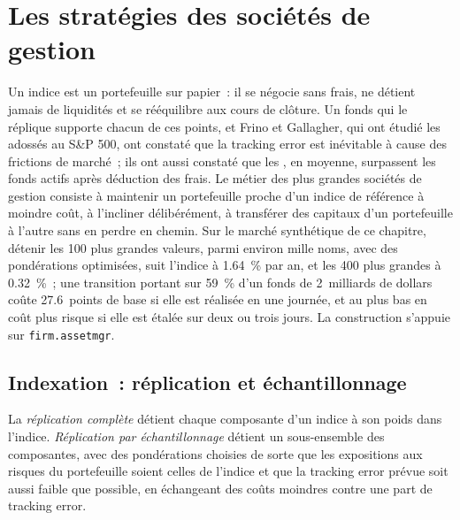 \chapter{Les stratégies des sociétés de gestion}\label{ch:s1:the-asset-managers-strategies}

Un indice est un portefeuille sur papier~: il se négocie sans frais, ne détient jamais de liquidités et se rééquilibre aux cours de clôture. Un fonds qui le réplique supporte chacun de ces
points, et Frino et Gallagher, qui ont étudié les  adossés au S\&P 500, ont constaté que la tracking error est inévitable à cause des frictions de marché~; ils ont aussi constaté que les
, en moyenne, surpassent les fonds actifs après déduction des frais. Le métier des plus grandes sociétés de gestion consiste à maintenir un portefeuille proche d'un indice de référence à moindre coût,
à l'incliner délibérément, à transférer des capitaux d'un portefeuille à l'autre sans en perdre en chemin. Sur le marché synthétique de ce chapitre, détenir les 100 plus grandes
valeurs, parmi environ mille noms, avec des pondérations optimisées, suit l'indice à 1.64~\% par an, et les 400 plus grandes à 0.32~\%~; une transition portant sur 59~\% d'un fonds de 2~milliards de dollars
coûte 27.6~points de base si elle est réalisée en une journée, et au plus bas en coût plus risque si elle est étalée sur deux ou trois jours. La construction s'appuie sur \texttt{firm.assetmgr}.

\section{Indexation~: réplication et échantillonnage}

\begin{definition}\label{def:s1:the-asset-managers-strategies:replication}
La \emph{réplication complète} détient chaque composante d'un indice à son poids dans l'indice. \emph{Réplication par échantillonnage}%
 détient un sous-ensemble des composantes, avec des pondérations choisies de sorte que les expositions aux risques du portefeuille soient celles de l'indice et que la tracking
error prévue soit aussi faible que possible, en échangeant des coûts moindres contre une part de tracking error.
\end{definition}

